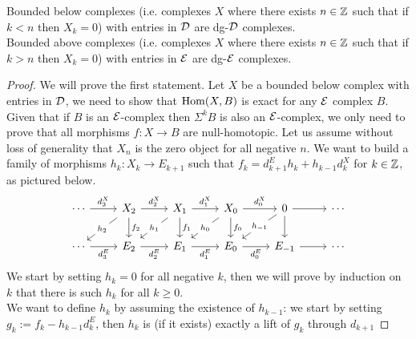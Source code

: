 \begin{lemma}
    \label{lem:dg-sphere}
    Bounded below complexes (i.e. complexes $X$ where there exists $n\in \mathbb{Z}$ such that if $k<n$ then $X_k = 0$) with entries in $\mathcal{D}$ are dg-$\mathcal{D}$ complexes.\\
     Bounded above complexes (i.e. complexes $X$ where there exists $n\in \mathbb{Z}$ such that if $k>n$ then $X_k = 0$) with entries in $\mathcal{E}$ are dg-$\mathcal{E}$ complexes.
\end{lemma}

\begin{proof}
    We will prove the first statement. Let $X$ be a bounded below complex with entries in $\mathcal{D}$, we need to show that $\mathrm{Hom}(X, B)$ is exact for any $\mathcal{E}$ complex $B$. Given that if $B$ is an $\mathcal{E}$-complex then $\Sigma^k B$ is also an $\mathcal{E}$-complex, we only need to prove that all morphisms $f\colon X \longrightarrow B$ are null-homotopic. Let us assume without loss of generality that $X_n$ is the zero object for all negative $n$. We want to build a family of morphisms $h_k \colon X_k \longrightarrow E_{k+1}$ such that $f_k =d_{k+1}^E h_k+ h_{k-1}d^X_k$ for $k \in \mathbb{Z}$, as pictured below.
    \[\begin{tikzcd}
        \cdots & {X_2} & {X_1} & {X_0} & 0 & \cdots \\
        \cdots & {E_2} & {E_1} & {E_0} & {E_{-1}} & \cdots
        \arrow["{{{d^X_3}}}", from=1-1, to=1-2]
        \arrow["{{{d^X_2}}}", from=1-2, to=1-3]
        \arrow["{{{h_2}}}"{description}, from=1-2, to=2-1]
        \arrow["{{{f_2}}}", from=1-2, to=2-2]
        \arrow["{{{d^X_1}}}", from=1-3, to=1-4]
        \arrow["{{{h_1}}}"{description}, from=1-3, to=2-2]
        \arrow["{{{f_1}}}", from=1-3, to=2-3]
        \arrow["{{{d^X_0}}}", from=1-4, to=1-5]
        \arrow["{{{h_0}}}"{description}, from=1-4, to=2-3]
        \arrow["{{{f_0}}}", from=1-4, to=2-4]
        \arrow[from=1-5, to=1-6]
        \arrow["{h_{-1}}"{description}, from=1-5, to=2-4]
        \arrow[from=1-5, to=2-5]
        \arrow["{{{d^E_3}}}"', from=2-1, to=2-2]
        \arrow["{{{d^E_2}}}"', from=2-2, to=2-3]
        \arrow["{{{d^E_1}}}"', from=2-3, to=2-4]
        \arrow["{{{d^E_0}}}"', from=2-4, to=2-5]
        \arrow[from=2-5, to=2-6]
    \end{tikzcd}\]
    We start by setting $h_k = 0$ for all negative $k$, then we will prove by induction on $k$ that there is such $h_k$ for all $k\geq 0$.\\
    We want to define $h_k$ by assuming the existence of $h_{k-1}$: we start by setting $g_k := f_k - h_{k-1}d_{k}^E$, then $h_k$ is (if it exists) exactly a lift of $g_k$ through $d_{k+1}$

\end{proof}
